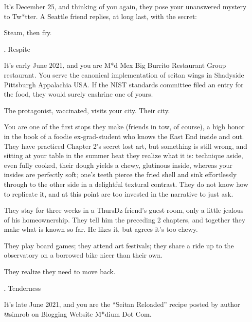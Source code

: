 \documentclass[12pt]{article}
\newcommand\chapter[2]{{\thispagestyle{empty} \Large \sc #1. \quad #2

\vspace{1.5em}}}
\begin{document}
It's December 25, and thinking of you again, they pose your unanswered mystery to Tw*tter.
A Seattle friend replies, at long last, with the secret:

Steam, then fry.

\newpage \thispagestyle{empty}

\chapter{3}{Respite}

It's early June 2021, and you are M*d Mex Big Burrito Restaurant Group restaurant.
%
You serve the canonical implementation of seitan wings
in Shadyside Pittsburgh Appalachia USA.
If the NIST standards committee filed an entry for the food, they would surely enshrine one of yours.

The protagonist, vaccinated, visits your city. Their city.

You are one of the first stops they make
(friends in tow, of course),
a high honor in the book of a foodie ex-grad-student who knows the East End inside and out.
They have practiced Chapter 2's secret lost art, but something is still wrong,
and sitting at your table in the summer heat they realize what it is:
technique aside, even fully cooked, their dough yields a chewy, glutinous inside,
whereas your insides are perfectly soft;
one's teeth pierce the fried shell and sink effortlessly through to the other side
in a delightful textural contrast.
They do not know how to replicate it, and at this point are too invested in the narrative to just ask.

They stay for three weeks in a ThursDz friend's guest room, only a little jealous of his homeownership.
They tell him the preceding 2 chapters, and together they make what is known so far.
He likes it, but agrees it's too chewy.

They play board games; they attend art festivals; they share a ride up to the observatory on a borrowed bike nicer than their own.

They realize they need to move back.

\newpage \thispagestyle{empty}

\chapter{4}{Tenderness}

It's late June 2021, and you are the ``Seitan Reloaded'' recipe posted by author {\sf @simrob} on Blogging Website M*dium Dot Com.
\end{document}
